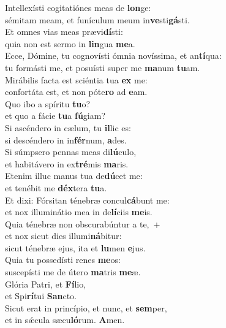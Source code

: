 \evenverse Intellexísti cogitatiónes meas de \textbf{lon}ge:~\*\\
\evenverse sémitam meam, et funículum meum in\textbf{ve}sti\textbf{gá}sti.\\
\oddverse Et omnes vias meas prævi\textbf{dí}sti:~\*\\
\oddverse quia non est sermo in \textbf{lin}gua \textbf{me}a.\\
\evenverse Ecce, Dómine, tu cognovísti ómnia novíssima, et an\textbf{tí}qua:~\*\\
\evenverse tu formásti me, et posuísti super me \textbf{ma}num \textbf{tu}am.\\
\oddverse Mirábilis facta est sciéntia tua \textbf{ex} me:~\*\\
\oddverse confortáta est, et non póte\textbf{ro} ad \textbf{e}am.\\
\evenverse Quo ibo a spíritu \textbf{tu}o?~\*\\
\evenverse et quo a fácie \textbf{tu}a \textbf{fú}giam?\\
\oddverse Si ascéndero in cælum, tu \textbf{il}lic es:~\*\\
\oddverse si descéndero in in\textbf{fér}num, \textbf{a}des.\\
\evenverse Si súmpsero pennas meas di\textbf{lú}culo,~\*\\
\evenverse et habitávero in ex\textbf{tré}mis \textbf{ma}ris.\\
\oddverse Etenim illuc manus tua de\textbf{dú}cet me:~\*\\
\oddverse et tenébit me \textbf{déx}tera \textbf{tu}a.\\
\evenverse Et dixi: Fórsitan ténebræ concul\textbf{cá}bunt me:~\*\\
\evenverse et nox illuminátio mea in de\textbf{lí}ciis \textbf{me}is.\\
\oddverse Quia ténebræ non obscurabúntur a te,~+\\
\oddverse  et nox sicut dies illumi\textbf{ná}bitur:~\*\\
\oddverse sicut ténebræ ejus, ita et \textbf{lu}men \textbf{e}jus.\\
\evenverse Quia tu possedísti renes \textbf{me}os:~\*\\
\evenverse suscepísti me de útero \textbf{ma}tris \textbf{me}æ.\\
\oddverse Glória Patri, et \textbf{Fí}lio,~\*\\
\oddverse et Spi\textbf{rí}tui \textbf{San}cto.\\
\evenverse Sicut erat in princípio, et nunc, et \textbf{sem}per,~\*\\
\evenverse et in sǽcula sæcu\textbf{ló}rum. \textbf{A}men.\\
